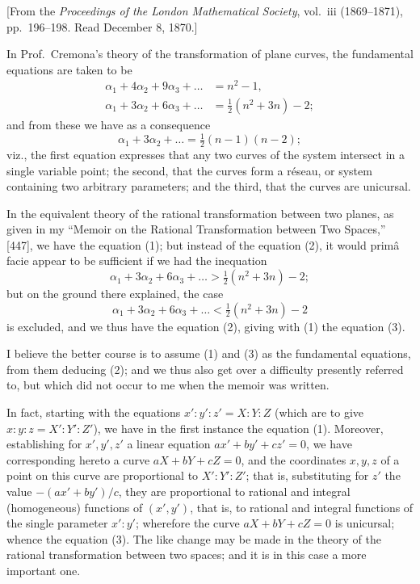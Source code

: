 \documentclass[11pt,a4paper]{article}
\begin{document}
[From the \textit{Proceedings of the London Mathematical Society}, vol.~iii (1869--1871), pp.~196--198. Read December 8, 1870.]

In Prof.~Cremona's theory of the transformation of plane curves, the fundamental equations are taken to be
\begin{align}
\alpha_1 + 4\alpha_2 + 9\alpha_3 + \ldots &= n^2 - 1 \tag{1},\\
\alpha_1 + 3\alpha_2 + 6\alpha_3 + \ldots &= \tfrac{1}{2}(n^2 + 3n) - 2 \tag{2};
\end{align}
and from these we have as a consequence
\[
\alpha_1 + 3\alpha_2 + \ldots = \tfrac{1}{2}(n-1)(n-2) \tag{3};
\]
viz., the first equation expresses that any two curves of the system intersect in a single variable point; the second, that the curves form a r\'eseau, or system containing two arbitrary parameters; and the third, that the curves are unicursal.

In the equivalent theory of the rational transformation between two planes, as given in my ``Memoir on the Rational Transformation between Two Spaces,'' [447], we have the equation (1); but instead of the equation (2), it would prim\^a facie appear to be sufficient if we had the inequation
\[
\alpha_1 + 3\alpha_2 + 6\alpha_3 + \ldots > \tfrac{1}{2}(n^2 + 3n) - 2;
\]
but on the ground there explained, the case
\[
\alpha_1 + 3\alpha_2 + 6\alpha_3 + \ldots < \tfrac{1}{2}(n^2 + 3n) - 2
\]
is excluded, and we thus have the equation (2), giving with (1) the equation (3).

I believe the better course is to assume (1) and (3) as the fundamental equations, from them deducing (2); and we thus also get over a difficulty presently referred to, but which did not occur to me when the memoir was written.

In fact, starting with the equations $x' : y' : z' = X : Y : Z$ (which are to give $x : y : z = X' : Y' : Z'$), we have in the first instance the equation (1). Moreover, establishing for $x', y', z'$ a linear equation $ax' + by' + cz' = 0$, we have corresponding hereto a curve $aX + bY + cZ = 0$, and the coordinates $x, y, z$ of a point on this curve are proportional to $X' : Y' : Z'$; that is, substituting for $z'$ the value $-(ax' + by')/c$, they are proportional to rational and integral (homogeneous) functions of $(x', y')$, that is, to rational and integral functions of the single parameter $x' : y'$; wherefore the curve $aX + bY + cZ = 0$ is unicursal; whence the equation (3). The like change may be made in the theory of the rational transformation between two spaces; and it is in this case a more important one.
\end{document}
